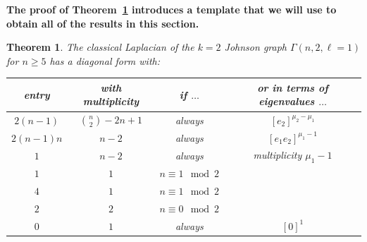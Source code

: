 \documentclass[11pt]{article}
\newtheorem{theorem}[theo]{Theorem}
\theoremstyle{definition}
\numberwithin{equation}{section}
\numberwithin{equation}{section}
\newcommand{\G}[0]{\Gamma}
\begin{document}
\medskip
{\bf The proof of Theorem~\ref{t:firstapp} introduces a template that we will use to obtain all of the results in this section.}

\begin{theorem}\label{t:firstapp}
The classical Laplacian of the $k=2$ Johnson graph $\G(n, 2, \ell = 1)$ for $n \geq 5$ has a diagonal form with:
\begin{center}
\begin{tabular}{ |c|c|c||c| } 
 \hline
 entry & with multiplicity & if $\ldots$ & or in terms of eigenvalues $\ldots$ \\ 
 \hline
$2(n-1)$ & $\binom{n}{2} - 2n + 1$ & always & $[e_2]^{\mu_2 - \mu_1}$ \\

$2(n - 1)n$ & $n - 2$ & always & $[e_1 e_2]^{\mu_1 - 1}$ \\
$1$ & $n - 2$ & always & multiplicity $\mu_1-1$ \\

$1$ & $1$ & $n \equiv 1 \mod 2$ & \\
$4$ & $1$ & $n \equiv 1 \mod 2$ & \\

$2$ & $2$ & $n \equiv 0 \mod 2$ & \\

$0$ & $1$ & always & $[0]^1$ \\
 \hline
\end{tabular}
\end{center}
\end{theorem}
\end{document}
